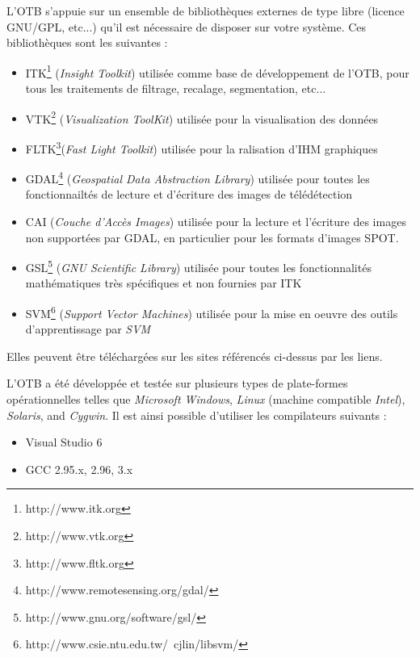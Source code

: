 L'OTB s'appuie sur un ensemble de biblioth\`{e}ques externes de type libre (licence GNU/GPL, etc...) qu'il est n\'{e}cessaire de disposer sur votre syst\`{e}me.
Ces biblioth\`{e}ques sont les suivantes :
\begin{itemize}
\item ITK\footnote{http://www.itk.org} (\emph{Insight Toolkit}) utilis\'{e}e comme base de d\'{e}veloppement de l'OTB, pour tous les traitements de filtrage, recalage, segmentation, etc...
\item VTK\footnote{http://www.vtk.org} (\emph{Visualization ToolKit}) utilis\'{e}e pour la visualisation des donn\'{e}es
\item FLTK\footnote{http://www.fltk.org}(\emph{Fast Light Toolkit}) utilis\'{e}e pour la ralisation d'IHM graphiques
\item GDAL\footnote{http://www.remotesensing.org/gdal/} (\emph{Geospatial Data Abstraction Library}) utilis\'{e}e pour toutes les fonctionnailt\'{e}s de lecture et d'\'{e}criture des images de t\'{e}l\'{e}d\'{e}tection
\item CAI (\emph{Couche d'Acc\`{e}s Images}) utilis\'{e}e pour la lecture et l'\'{e}criture des images non support\'{e}es par GDAL, en particulier pour les formats d'images SPOT.
\item GSL\footnote{http://www.gnu.org/software/gsl/} (\emph{GNU Scientific Library}) utilis\'{e}e pour toutes les fonctionnalit\'{e}s math\'{e}matiques 
tr\`{e}s sp\'{e}cifiques et non fournies par ITK
\item SVM\footnote{http://www.csie.ntu.edu.tw/~cjlin/libsvm/} (\emph{Support Vector Machines}) utilis\'{e}e pour la mise en oeuvre des outils d'apprentissage par \emph{SVM}
\end{itemize}

Elles peuvent \^{e}tre t\'{e}l\'{e}charg\'{e}es sur les sites r\'{e}f\'{e}renc\'{e}s ci-dessus par les liens.



L'OTB a \'{e}t\'{e} d\'{e}velopp\'{e}e et test\'{e}e sur plusieurs types de plate-formes op\'{e}rationnelles telles que \emph{Microsoft Windows}, 
\emph{Linux} (machine compatible \emph{Intel}), \emph{Solaris}, and \emph{Cygwin}.
Il est ainsi possible d'utiliser les compilateurs suivants :
\begin{itemize}
\item Visual Studio 6
\item GCC 2.95.x, 2.96, 3.x
\end{itemize}

